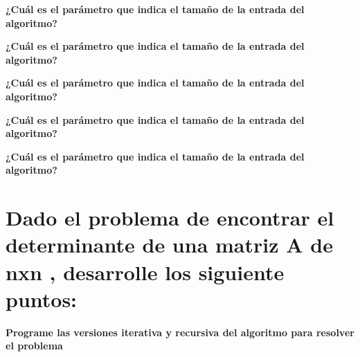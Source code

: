 \documentclass{article}
\begin{document}
\begin{question}
  \textbf{¿Cuál es el parámetro que indica el tamaño de la entrada del algoritmo?}
  \textit{}
    
\end{question}
\begin{question}
  \textbf{¿Cuál es el parámetro que indica el tamaño de la entrada del algoritmo?}
  \textit{}
    
\end{question}
\begin{question}
  \textbf{¿Cuál es el parámetro que indica el tamaño de la entrada del algoritmo?}
  \textit{}
    
\end{question}
\begin{question}
  \textbf{¿Cuál es el parámetro que indica el tamaño de la entrada del algoritmo?}
  \textit{}
    
\end{question}

\begin{question}
  \textbf{¿Cuál es el parámetro que indica el tamaño de la entrada del algoritmo?}
  \textit{}
    
\end{question}

\section{Dado el problema de encontrar el determinante de una matriz A de nxn , desarrolle los siguiente puntos:}

\begin{question}
  \textbf{Programe las versiones iterativa y recursiva del algoritmo para resolver el problema}
\end{question}
\end{document}
